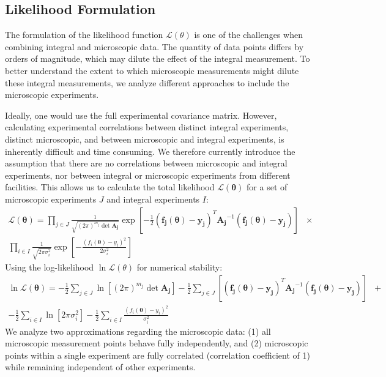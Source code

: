 \documentclass[preprint,review,12pt]{elsarticle}
\begin{document}
\subsection{Likelihood Formulation}
The formulation of the likelihood function $\mathcal{L}(\theta)$ is one of the challenges when combining integral and microscopic data. The quantity of data points differs by orders of magnitude, which may dilute the effect of the integral measurement. To better understand the extent to which microscopic measurements might dilute these integral measurements, we analyze different approaches to include the microscopic experiments.

Ideally, one would use the full experimental covariance matrix. However, calculating experimental correlations between distinct integral experiments, distinct microscopic, and between microscopic and integral experiments, is inherently difficult and time consuming. We therefore currently introduce the assumption that there are no correlations between microscopic and integral experiments, nor between integral or microscopic experiments from different facilities. This allows us to calculate the total likelihood $\mathcal{L}(\mathbf{\theta})$ for a set of microscopic experiments $J$ and integral experiments $I$:
\begin{equation}
    \begin{split}
        \mathcal{L} (\mathbf{\theta}) = \prod_{j\in J} \frac{1}{\sqrt{(2\pi)^{m_j}\det\mathbf{A_j}}}\exp\left[-\frac{1}{2}(\mathbf{f_j(\theta)}-\mathbf{y_{j}})^T\mathbf{A_j}^{-1}(\mathbf{f_j(\theta)}-\mathbf{y_{j}})\right] & \times \\
        \prod_{i\in I} \frac{1}{\sqrt{2\pi\sigma^2_i}}\exp\left[-\frac{(f_i(\mathbf{\theta})-y_{i})^2}{2\sigma_{i}^2}\right]
    \end{split}
\end{equation}
Using the log-likelihood $\ln\mathcal{L}(\theta)$ for numerical stability:
\begin{equation}\label{eq:loglikelihood}
    \begin{split}
        \ln\mathcal{L} (\mathbf{\theta}) = -\frac{1}{2} \sum_{j\in J} \ln\left[(2\pi)^{m_j}\det\mathbf{A_j}\right] - \frac{1}{2}\sum_{j\in J}\left[(\mathbf{f_j(\theta)}-\mathbf{y_{j}})^T\mathbf{A_j}^{-1}(\mathbf{f_j(\theta)}-\mathbf{y_{j}})\right] & + \\
        -\frac{1}{2}\sum_{i\in I} \ln \left[2\pi\sigma^2_i\right] - \frac{1}{2}\sum_{i\in I}\frac{(f_i(\mathbf{\theta})-y_{i})^2}{\sigma_{i}^2} 
    \end{split}
\end{equation}
We analyze two approximations regarding the microscopic data: (1) all microscopic measurement points behave fully independently, and (2) microscopic points within a single experiment are fully correlated (correlation coefficient of 1) while remaining independent of other experiments.
\end{document}
